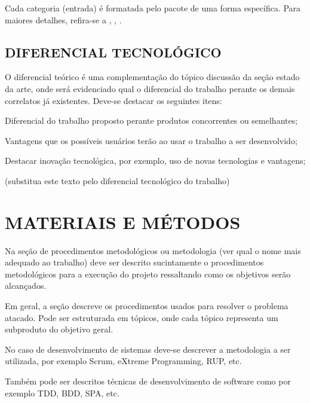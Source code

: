 Cada categoria (entrada) é formatada pelo pacote  de uma forma específica. Para maiores detalhes, refira-se a , , .

\subsection{DIFERENCIAL TECNOLÓGICO}
\label{sec:diferencial}
O diferencial teórico é uma complementação do tópico discussão da seção estado da arte, onde será evidenciado qual o diferencial do trabalho perante os demais correlatos já existentes. Deve-se destacar os seguintes itens:

Diferencial do trabalho proposto perante produtos concorrentes ou semelhantes;

Vantagens que os possíveis usuários terão ao usar o trabalho a ser desenvolvido;

Destacar inovação tecnológica, por exemplo, uso de novas tecnologias e vantagens;

(substitua este texto pelo diferencial tecnológico do trabalho)

\section{MATERIAIS E MÉTODOS} %
\label{sec:metodologia}
Na seção de procedimentos metodológicos ou metodologia (ver qual o nome mais adequado ao trabalho) deve ser descrito sucintamente o procedimentos metodológicos para a execução do projeto ressaltando como os objetivos serão alcançados. 

Em geral, a seção descreve os procedimentos usados para resolver o problema atacado. Pode ser estruturada em tópicos, onde cada tópico representa um subproduto do objetivo geral.

No caso de desenvolvimento de sistemas deve-se descrever a metodologia a ser utilizada, por exemplo Scrum, eXtreme Programming, RUP, etc. 

Também pode ser descritos técnicas de desenvolvimento de software como por exemplo TDD, BDD, SPA,  etc.

